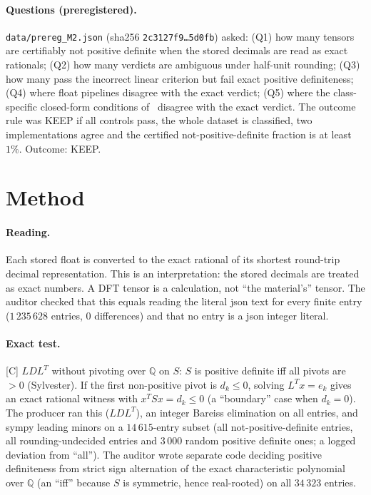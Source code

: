 \documentclass[10pt]{article}
\newcommand{\tier}[1]{\textsf{[#1]}}
\newcommand{\tC}{\tier{C}}
\newcommand{\Q}{\mathbb{Q}}
\begin{document}
\paragraph{Questions (preregistered).} \texttt{data/prereg\_M2.json} (sha256 \texttt{2c3127f9\dots5d0fb}) asked: (Q1) how many tensors are certifiably not positive definite when the stored decimals are read as exact rationals; (Q2) how many verdicts are ambiguous under half-unit rounding; (Q3) how many pass the incorrect linear criterion but fail exact positive definiteness; (Q4) where float pipelines disagree with the exact verdict; (Q5) where the class-specific closed-form conditions of~\cite{mc} disagree with the exact verdict. The outcome rule was KEEP if all controls pass, the whole dataset is classified, two implementations agree and the certified not-positive-definite fraction is at least $1\%$. Outcome: KEEP.

\section{Method}\label{sec:method}
\paragraph{Reading.} Each stored float is converted to the exact rational of its shortest round-trip decimal representation. This is an interpretation: the stored decimals are treated as exact numbers. A DFT tensor is a calculation, not ``the material's'' tensor. The auditor checked that this equals reading the literal json text for every finite entry ($1\,235\,628$ entries, $0$ differences) and that no entry is a json integer literal.

\paragraph{Exact test.}\tC{} $LDL^T$ without pivoting over $\Q$ on $S$: $S$ is positive definite iff all pivots are $>0$ (Sylvester). If the first non-positive pivot is $d_k\le0$, solving $L^Tx=e_k$ gives an exact rational witness with $x^TSx=d_k\le0$ (a ``boundary'' case when $d_k=0$). The producer ran this ($LDL^T$), an integer Bareiss elimination on all entries, and sympy leading minors on a $14\,615$-entry subset (all not-positive-definite entries, all rounding-undecided entries and $3\,000$ random positive definite ones; a logged deviation from ``all''). The auditor wrote separate code deciding positive definiteness from strict sign alternation of the exact characteristic polynomial over $\Q$ (an ``iff'' because $S$ is symmetric, hence real-rooted) on all $34\,323$ entries.
\end{document}
